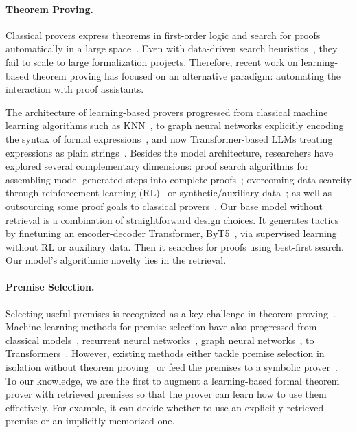 \documentclass{article}
\newcommand{\smallsec}[1]{\vspace{-1mm} \paragraph{#1.}}
\begin{document}
\smallsec{Theorem Proving}
Classical provers express theorems in first-order logic and search for proofs automatically in a large space~\cite{robinson2001handbook,kovacs2013first}. Even with data-driven search heuristics~\cite{loos2017deep,bridge2014machine}, they fail to scale to large formalization projects. Therefore, recent work on learning-based theorem proving has focused on an alternative paradigm: automating the interaction with proof assistants. 

The architecture of learning-based provers progressed from classical machine learning algorithms such as KNN~\cite{gauthier2021tactictoe}, to graph neural networks explicitly encoding the syntax of formal expressions~\cite{yang2019learning,paliwal2020graph}, and now Transformer-based LLMs treating expressions as plain strings~\cite{polu2020generative}. Besides the model architecture, researchers have explored several complementary dimensions: proof search algorithms for assembling model-generated steps into complete proofs~\cite{lample2022hypertree,wang2023dt}; overcoming data scarcity through reinforcement learning (RL)~\cite{bansal2019learning,wu2021tacticzero,lample2022hypertree,polu2023formal} or synthetic/auxiliary data~\cite{wang2020learning,rabe2021mathematical,wu2021lime,han2022proof}; as well as outsourcing some proof goals to classical provers~\cite{bohme2010sledgehammer,blanchette2016hammering,czajka2018hammer,jiang2022thor}. Our base model without retrieval is a combination of straightforward design choices. It generates tactics by finetuning an encoder-decoder Transformer, ByT5~\cite{xue2022byt5}, via supervised learning without RL or auxiliary data. Then it searches for proofs using best-first search. Our model's algorithmic novelty lies in the retrieval.


\smallsec{Premise Selection}
Selecting useful premises is recognized as a key challenge in theorem proving~\cite{urban2004mptp,irving2016deepmath,szegedy2021retrieval,wu2022formal}. Machine learning methods for premise selection have also progressed from classical models~\cite{alama2014premise,bohme2010sledgehammer,piotrowski2023machinelearned}, recurrent neural networks~\cite{irving2016deepmath}, graph neural networks~\cite{wang2020learning}, to Transformers~\cite{mikula2023magnushammer,yeh2023coprover}. However, existing methods either tackle premise selection in isolation without theorem proving~\cite{piotrowski2023machinelearned,irving2016deepmath,wang2020learning} or feed the premises to a symbolic prover~\cite{alama2014premise,bohme2010sledgehammer,mikula2023magnushammer}. To our knowledge, we are the first to augment a learning-based formal theorem prover with retrieved premises so that the prover can learn how to use them effectively. For example, it can decide whether to use an explicitly retrieved premise or an implicitly memorized one.
\end{document}
